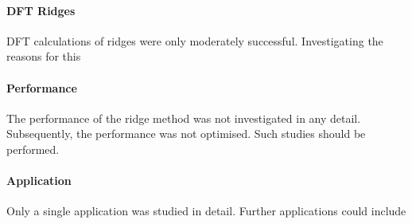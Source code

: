 \paragraph{DFT Ridges}
DFT calculations of ridges were only moderately successful.
Investigating the reasons for this \expand {}

\paragraph{Performance}
The performance of the ridge method was not investigated in any detail.
Subsequently, the performance was not optimised.
Such studies should be performed.

\paragraph{Application}
Only a single application was studied in detail.
Further applications could include \expand 

